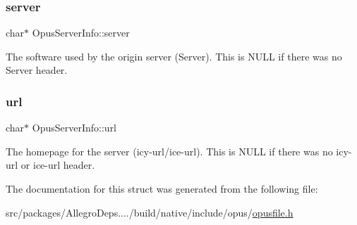 \subsubsection{\texorpdfstring{server}{server}}
{\footnotesize\ttfamily char$\ast$ Opus\+Server\+Info\+::server}

The software used by the origin server (Server). This is {\ttfamily N\+U\+LL} if there was no {\ttfamily Server} header. \mbox{\label{struct_opus_server_info_a7f9aef47413c849bb240ef70394401b1}} 
\subsubsection{\texorpdfstring{url}{url}}
{\footnotesize\ttfamily char$\ast$ Opus\+Server\+Info\+::url}

The homepage for the server (icy-\/url/ice-\/url). This is {\ttfamily N\+U\+LL} if there was no {\ttfamily icy-\/url} or {\ttfamily ice-\/url} header. 

The documentation for this struct was generated from the following file\+:\begin{DoxyCompactItemize}
\item 
src/packages/\+Allegro\+Deps..../build/native/include/opus/\hyperlink{opusfile_8h}{opusfile.\+h}\end{DoxyCompactItemize}
